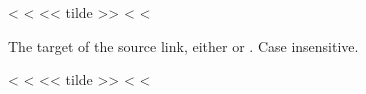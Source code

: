 \documentclass[letterpaper,10pt,english]{sphinxmanual}
\begin{document}
\begin{fulllineitems}
\label{\detokenize{confval:confval-source_link_target}}
<%
\pysigstartsignatures
<%
<< tilde >>
<%
<%
\vspace{-45px}

\begin{DUlineblock}{0em}
\item[]  
\item[]  
\item[]  
\end{DUlineblock}

\vspace{-25px}

The target of the source link, either  or .
Case insensitive.

\end{fulllineitems}


\begin{fulllineitems}
\label{\detokenize{confval:confval-github_username}}
<%
\pysigstartsignatures
<%
<< tilde >>
<%
<%
\vspace{-45px}

\begin{DUlineblock}{0em}
\item[]  
\item[]  
\end{DUlineblock}

\end{fulllineitems}
\end{document}
